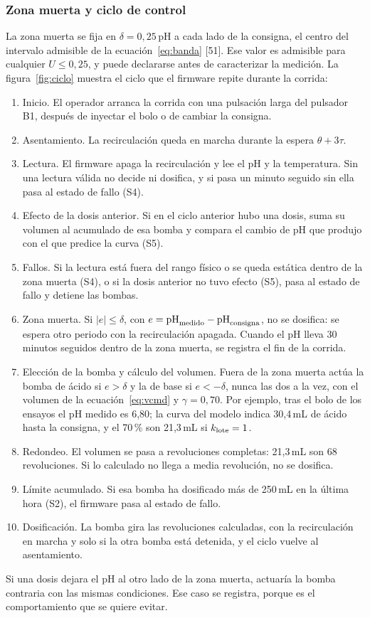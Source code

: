 \subsubsection{Zona muerta y ciclo de control}\label{sec:ciclo}
La zona muerta se fija en $\delta=0{,}25$\,pH a cada lado de la consigna, el centro del intervalo admisible de la ecuación~\eqref{eq:banda} [51]. Ese valor es admisible para cualquier $U\le0{,}25$, y puede declararse antes de caracterizar la medición. La figura~\ref{fig:ciclo} muestra el ciclo que el firmware repite durante la corrida:
\begin{enumerate}
\item Inicio. El operador arranca la corrida con una pulsación larga del pulsador B1, después de inyectar el bolo o de cambiar la consigna.
\item Asentamiento. La recirculación queda en marcha durante la espera $\theta+3\tau$.
\item Lectura. El firmware apaga la recirculación y lee el pH y la temperatura. Sin una lectura válida no decide ni dosifica, y si pasa un minuto seguido sin ella pasa al estado de fallo (S4).
\item Efecto de la dosis anterior. Si en el ciclo anterior hubo una dosis, suma su volumen al acumulado de esa bomba y compara el cambio de pH que produjo con el que predice la curva (S5).
\item Fallos. Si la lectura está fuera del rango físico o se queda estática dentro de la zona muerta (S4), o si la dosis anterior no tuvo efecto (S5), pasa al estado de fallo y detiene las bombas.
\item Zona muerta. Si $|e|\le\delta$, con $e=\mathrm{pH}_{\text{medido}}-\mathrm{pH}_{\text{consigna}}$, no se dosifica: se espera otro periodo con la recirculación apagada. Cuando el pH lleva 30 minutos seguidos dentro de la zona muerta, se registra el fin de la corrida.
\item Elección de la bomba y cálculo del volumen. Fuera de la zona muerta actúa la bomba de ácido si $e>\delta$ y la de base si $e<-\delta$, nunca las dos a la vez, con el volumen de la ecuación~\eqref{eq:vcmd} y $\gamma=0{,}70$. Por ejemplo, tras el bolo de los ensayos el pH medido es 6,80; la curva del modelo indica 30,4\,mL de ácido hasta la consigna, y el 70\,\% son 21,3\,mL si $k_{\text{lote}}=1$.
\item Redondeo. El volumen se pasa a revoluciones completas: 21,3\,mL son 68 revoluciones. Si lo calculado no llega a media revolución, no se dosifica.
\item Límite acumulado. Si esa bomba ha dosificado más de 250\,mL en la última hora (S2), el firmware pasa al estado de fallo.
\item Dosificación. La bomba gira las revoluciones calculadas, con la recirculación en marcha y solo si la otra bomba está detenida, y el ciclo vuelve al asentamiento.
\end{enumerate}
Si una dosis dejara el pH al otro lado de la zona muerta, actuaría la bomba contraria con las mismas condiciones. Ese caso se registra, porque es el comportamiento que se quiere evitar.

